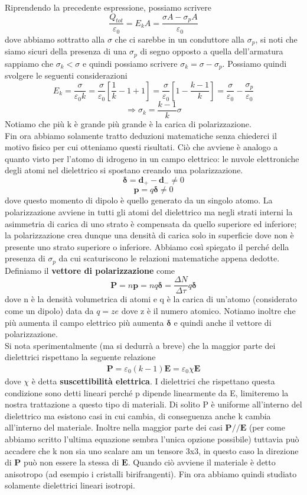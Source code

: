 \documentclass[10pt,a4paper]{article}
\begin{document}
Riprendendo la precedente espressione, possiamo scrivere
 \[\frac{Q_{tot}}{\varepsilon_0} = E_k A = \frac{\sigma A - \sigma_p A}{\varepsilon_0}\]
dove abbiamo sottratto alla $\sigma$ che ci sarebbe in un conduttore alla $\sigma_p$, si noti che siamo sicuri della presenza di una $\sigma_p$ di segno opposto a quella dell'armatura  sappiamo che \(\sigma_k<\sigma\) e quindi possiamo scrivere \(\sigma_k = \sigma -\sigma_p\). Possiamo quindi svolgere le seguenti considerazioni
\[E_k = \frac{\sigma }{\varepsilon_0 k} = \frac{\sigma}{\varepsilon_0}\left[\frac{1}{k}-1+1\right] = \frac{\sigma}{\varepsilon_0}\left[1-\frac{k-1}{k}\right] = \frac{\sigma}{\varepsilon_0}-\frac{\sigma_p}{\varepsilon_0}\]
\[\Rightarrow \sigma_k = \frac{k-1}{k}\sigma\]
Notiamo che più k è grande più grande è la carica di polarizzazione.\\
Fin ora abbiamo solamente tratto deduzioni matematiche senza chiederci il motivo fisico per cui otteniamo questi risultati. Ciò che avviene è analogo a quanto visto per l'atomo di idrogeno in un campo elettrico: le nuvole elettroniche degli atomi nel dielettrico si spostano creando una polarizzazione. 
\[\mathbf{\delta} = \mathbf{d}_+ -\mathbf{d}_- \neq 0\]
\[\mathbf{p} = q\mathbf{\delta}\neq 0\]
dove questo momento di dipolo è quello generato da un singolo atomo. La polarizzazione avviene in tutti gli atomi del dielettrico ma negli strati interni la asimmetria di carica di uno strato è compensata da quello superiore ed inferiore; la polarizzazione crea dunque una densità di carica solo in superficie dove non è presente uno strato superiore o inferiore. Abbiamo così spiegato il perché della presenza di \(\sigma_p\) da cui scaturiscono le relazioni matematiche appena dedotte. Definiamo il \textbf{vettore di polarizzazione} come
\[\mathbf{P} = n\mathbf{p} = nq\mathbf{\delta} = \frac{\Delta N}{\Delta \tau} q \mathbf{\delta} \]  
dove n è la densità volumetrica di atomi e q è la carica di un'atomo (considerato come un dipolo) data da \(q = ze\) dove z è il numero atomico. Notiamo inoltre che più aumenta il campo elettrico più aumenta $\mathbf{\delta}$ e quindi anche il vettore di polarizzazione.\\
Si nota sperimentalmente (ma si dedurrà a breve) che la maggior parte dei dielettrici rispettano la seguente relazione
\begin{align}\label{eq:polarizzazione_lineare}
	\mathbf{P} = \varepsilon_0(k-1)\mathbf{E} = \varepsilon_0 \chi \mathbf{E}
\end{align}
dove $\chi$ è detta \textbf{suscettibilità elettrica}. I dielettrici che rispettano questa condizione sono detti lineari perché p dipende linearmente da E, limiteremo la nostra trattazione a questo tipo di materiali. Di solito P è uniforme all'interno del dielettrico ma esistono casi in cui cambia, di conseguenza anche k cambia all'interno del materiale. Inoltre nella maggior parte dei casi \(\mathbf{P} // \mathbf{E}\) (per come abbiamo scritto l'ultima equazione sembra l'unica opzione possibile) tuttavia può accadere che k non sia uno scalare am un tensore 3x3, in questo caso la direzione di $\mathbf{P}$ può non essere la stessa di $\mathbf{E}$. Quando ciò avviene il materiale è detto anisotropo (ad esempio i cristalli birifrangenti). Fin ora abbiamo quindi studiato solamente dielettrici lineari isotropi.
\end{document}
